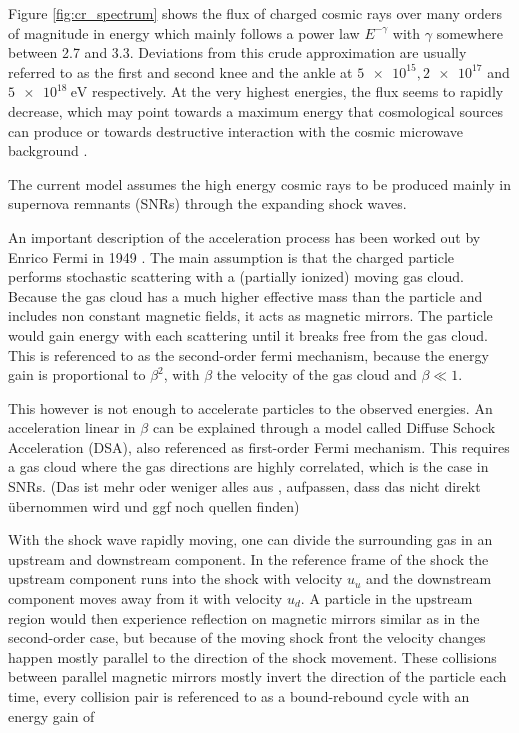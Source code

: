 Figure \ref{fig:cr_spectrum} shows the flux of charged cosmic rays over 
many orders of magnitude in energy which mainly follows 
a power law $E^{-\gamma}$ with $\gamma$ somewhere between 
2.7 and 3.3. Deviations from this crude approximation are 
usually referred to as the first and second knee and the ankle 
at $\num{5e15}, \num{2e17}$ and $\SI{5e18}{\electronvolt}$ respectively.
At the very highest energies, the flux seems to rapidly decrease,
which may point towards a maximum energy
that cosmological sources can produce or towards destructive interaction with 
the cosmic microwave background \cite{bookap}.

The current model assumes the high energy cosmic rays to be produced 
mainly in supernova remnants (SNRs) through the expanding shock waves.

An important description of the acceleration process has been
worked out by Enrico Fermi in 1949 \cite{PhysRev.75.1169}.
The main assumption is that the charged particle performs 
stochastic scattering with a (partially ionized) moving gas cloud.
Because the gas cloud has a much higher effective mass than the particle and
includes non constant magnetic fields, it acts as magnetic mirrors.
The particle would gain energy with each scattering until it breaks free from the 
gas cloud. This is referenced to as the second-order fermi mechanism, 
because the energy gain is proportional to $\beta^2$, with $\beta$
the velocity of the gas cloud and $\beta \ll 1$.

This however is not enough to accelerate particles to the observed energies.
An acceleration linear in $\beta$ can be explained through a model called
Diffuse Schock Acceleration (DSA), also referenced as first-order
Fermi mechanism.
This requires a gas cloud where the gas directions are highly correlated,
which is the case in SNRs.
(Das ist mehr oder weniger alles aus \cite{bookap}, 
aufpassen, dass das nicht direkt übernommen wird und ggf noch quellen finden)

With the shock wave rapidly moving, one can divide the surrounding gas in 
an upstream and downstream component. In the reference frame of the shock
the upstream component runs into the shock with 
velocity $u_u$ and the downstream component moves away from 
it with velocity $u_d$.
A particle in the upstream region would then experience reflection on 
magnetic mirrors similar as in the second-order case, but because of the 
moving shock front the velocity changes happen mostly 
parallel to the direction of the shock movement.
These collisions between parallel magnetic mirrors mostly
invert the direction of the particle each time, every collision pair 
is referenced to as a bound-rebound cycle with an energy gain of 

